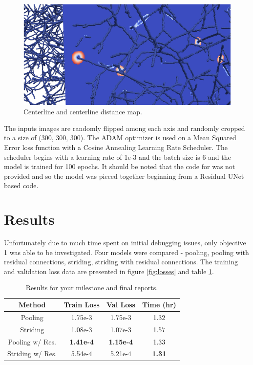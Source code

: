 \documentclass[10pt,twocolumn,letterpaper]{article}
\begin{document}
\begin{figure}[!h]
    \begin{center}
       \includegraphics[width=0.95\linewidth]{figures/map-centerline.png}
    \end{center}
       \caption{Centerline and centerline distance map.}
    \label{fig:centerline map}
\end{figure}

The inputs images are randomly flipped among each axis and randomly cropped to a size of (300, 300, 300). The ADAM optimizer is used on a Mean Squared Error loss function with a Cosine Annealing Learning Rate Scheduler. The scheduler begins with a learning rate of 1e-3 and the batch size is 6 and the model is trained for 100 epochs. It should be noted that the code for \cite{guoDeepCenterlineMultitaskFully2019} was not provided and so the model was pieced together beginning from a Residual UNet based code.



\section{Results}

Unfortunately due to much time spent on initial debugging issues, only objective 1 was able to be investigated. Four models were compared - pooling, pooling with residual connections, striding, striding with residual connections. The training and validation loss data are presented in figure \ref{fig:losses} and table \ref{table:results}.

\begin{table}
\begin{center}
\begin{tabular}{ c | c | c | c }
\hline
Method & Train Loss & Val Loss & Time (hr) \\
\hline
Pooling & 1.75e-3 & 1.75e-3 & 1.32 \\
Striding & 1.08e-3 & 1.07e-3 & 1.57 \\
Pooling w/ Res. & \bf 1.41e-4 & \bf 1.15e-4 & 1.33 \\
Striding w/ Res. & 5.54e-4 & 5.21e-4 & \bf 1.31 \\
\hline
\end{tabular}
\end{center}
\caption{Results for your milestone and final reports.}
\label{table:results}
\end{table}
\end{document}
